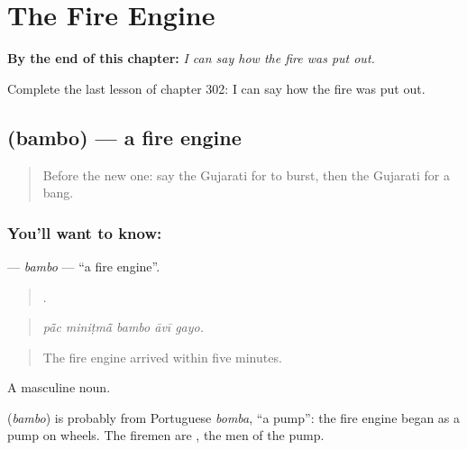
\chapter{The Fire Engine}
\label{ch:gu-the-fire-engine}

\begin{chapteropening}
\textbf{By the end of this chapter:} \emph{I can say how the fire was put out.}

Complete the last lesson of chapter 302: I can say how the fire was put out.
\end{chapteropening}

\section[\texorpdfstring{\gu{બંબો} (bambo)}{બંબો (bambo)}]{ (bambo) — a fire engine}

\label{lesson:GU-C302-bambo}



\begin{quote}
Before the new one: say the Gujarati for to burst, then the Gujarati for a bang.
\end{quote}

\subsection*{You'll want to know: }
\textbf{} — \emph{bambo} — \textquotedblleft{}a fire engine\textquotedblright{}.

\begin{quote}
    .
\end{quote}

\begin{quote}
\emph{pā̃c miniṭmā̃ bambo āvī gayo.}
\end{quote}

\begin{quote}
The fire engine arrived within five minutes.
\end{quote}

A masculine noun.

\begin{cousinweb}
\textbf{} (\emph{bambo}) is probably from Portuguese \emph{bomba}, \textquotedblleft{}a pump\textquotedblright{}: the fire engine began as a pump on wheels. The firemen are \textbf{}, the men of the pump.
\end{cousinweb}

